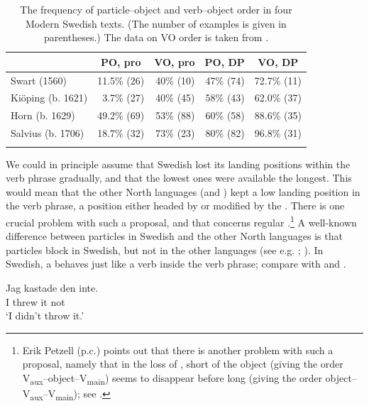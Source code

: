 \documentclass[output=paper]{langscibook}
\begin{document}
\begin{table}
\caption{The frequency of particle–object and verb–object order in four Modern Swedish texts. (The number of examples is given in parentheses.) The data on VO order is taken from \citet{Petzell2012}.\label{tab:lalu:3}}
\begin{tabular}{lrrrr}
\lsptoprule
& \multicolumn{1}{c}{PO, pro} & \multicolumn{1}{c}{VO, pro} & \multicolumn{1}{c}{PO, DP} & \multicolumn{1}{c}{VO, DP}\\\midrule
Swart (1560) & 11.5\% (26) & 40\% (10) & 47\% (74) & 72.7\% (11)\\
Kiöping (b. 1621) & 3.7\% (27) & 40\% (45) & 58\% (43) & 62.0\%   (37)\\
Horn (b. 1629) & 49.2\%   (69) & 53\%   (88) & 60\% (58) & 88.6\% (35)\\
Salvius (b. 1706) & 18.7\% (32) & 73\% (23) & 80\% (82) & 96.8\% (31)\\
\lspbottomrule
\end{tabular}
\end{table}

We could in principle assume that Swedish lost its landing positions within the verb phrase gradually, and that the lowest ones were available the longest. This would mean that the other North  languages (and ) kept a low landing position in the verb phrase, a position either headed by or modified by the . There is one crucial problem with such a proposal, and that concerns regular .\footnote{Erik Petzell (p.c.) points out that there is another problem with such a proposal, namely that in the loss of , short  of the object (giving the order V\textsubscript{aux}–object--V\textsubscript{main}) seems to disappear before long  (giving the order object--V\textsubscript{aux}–V\textsubscript{main}); see \citet{Petzell2012}.} A well-known difference between particles in Swedish and the other North  languages is that particles block  in Swedish, but not in the other languages (see e.g. \citealt{Holmberg1986}; \citealt{Sells1998}). In Swedish, a  behaves just like a verb inside the verb phrase; compare  with  and .


\ea\label{ex:lalu:47}
\ea\label{ex:lalu:47a}
\gll  Jag   kastade   den   inte.\\
 I       threw   it     not\\
\glt `I didn’t throw it.'
\end{document}
